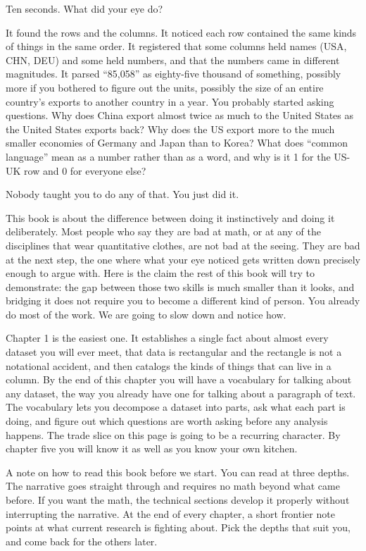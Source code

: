 \documentclass[
  letterpaper,
  11pt,
  twoside,
  openany]{scrbook}
\begin{document}
Ten seconds. What did your eye do?

It found the rows and the columns. It noticed each row contained the
same kinds of things in the same order. It registered that some columns
held names (USA, CHN, DEU) and some held numbers, and that the numbers
came in different magnitudes. It parsed ``85,058'' as eighty-five
thousand of something, possibly more if you bothered to figure out the
units, possibly the size of an entire country's exports to another
country in a year. You probably started asking questions. Why does China
export almost twice as much to the United States as the United States
exports back? Why does the US export more to the much smaller economies
of Germany and Japan than to Korea? What does ``common language'' mean
as a number rather than as a word, and why is it 1 for the US-UK row and
0 for everyone else?

Nobody taught you to do any of that. You just did it.

This book is about the difference between doing it instinctively and
doing it deliberately. Most people who say they are bad at math, or at
any of the disciplines that wear quantitative clothes, are not bad at
the seeing. They are bad at the next step, the one where what your eye
noticed gets written down precisely enough to argue with. Here is the
claim the rest of this book will try to demonstrate: the gap between
those two skills is much smaller than it looks, and bridging it does not
require you to become a different kind of person. You already do most of
the work. We are going to slow down and notice how.

Chapter 1 is the easiest one. It establishes a single fact about almost
every dataset you will ever meet, that data is rectangular and the
rectangle is not a notational accident, and then catalogs the kinds of
things that can live in a column. By the end of this chapter you will
have a vocabulary for talking about any dataset, the way you already
have one for talking about a paragraph of text. The vocabulary lets you
decompose a dataset into parts, ask what each part is doing, and figure
out which questions are worth asking before any analysis happens. The
trade slice on this page is going to be a recurring character. By
chapter five you will know it as well as you know your own kitchen.

A note on how to read this book before we start. You can read at three
depths. The narrative goes straight through and requires no math beyond
what came before. If you want the math, the technical sections develop
it properly without interrupting the narrative. At the end of every
chapter, a short frontier note points at what current research is
fighting about. Pick the depths that suit you, and come back for the
others later.
\end{document}
